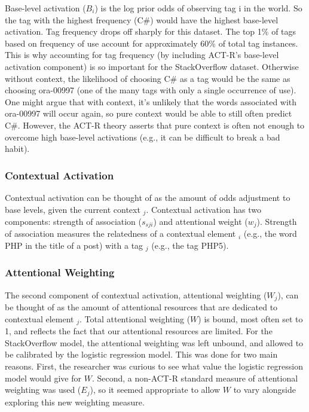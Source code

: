 \documentclass[10pt,letterpaper]{article}
\begin{document}
Base-level activation ($B_{i}$) is the log prior odds of observing tag i in the world.
So the tag with the highest frequency (C\#) would have the highest base-level activation.
Tag frequency drops off sharply for this dataset.
The top 1\% of tags based on frequency of use account for approximately 60\% of total tag instances.
This is why accounting for tag frequency (by including ACT-R's base-level activation component) is so important for the StackOverflow dataset.
Otherwise without context, the likelihood of choosing C\# as a tag would be the same as choosing ora-00997 (one of the many tags with only a single occurrence of use).
One might argue that with context, it's unlikely that the words associated with ora-00997 will occur again, so pure context would be able to still often predict C\#.
However, the ACT-R theory asserts that pure context is often not enough to overcome high base-level activations (e.g., it can be difficult to break a bad habit).

\subsubsection{Contextual Activation}

Contextual activation can be thought of as the amount of odds adjustment to base levels, given the current context $_{j}$.
Contextual activation has two components: strength of association ($s_{sji}$) and attentional weight ($w_{j}$).
Strength of association measures the relatedness of a contextual element $_{i}$ (e.g., the word PHP in the title of a post) with a tag $_{j}$ (e.g., the tag PHP5).

\subsubsection{Attentional Weighting}

The second component of contextual activation, attentional weighting ($W_{j}$), can be thought of as the amount of attentional resources that are dedicated to contextual element $_{j}$.
Total attentional weighting ($W$) is bound, most often set to 1, and reflects the fact that our attentional resources are limited.
For the StackOverflow model, the attentional weighting was left unbound, and allowed to be calibrated by the logistic regression model.
This was done for two main reasons.
First, the researcher was curious to see what value the logistic regression model would give for $W$.
Second, a non-ACT-R standard measure of attentional weighting was used ($E_{j}$), so it seemed appropriate to allow $W$ to vary alongside exploring this new weighting measure. 
\end{document}

